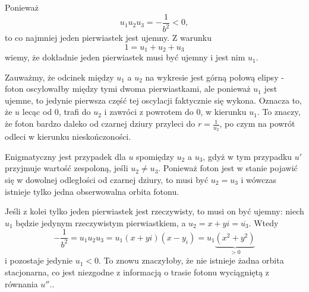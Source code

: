 Ponieważ 
$$u_1u_2u_3=-\frac{1}{b^2}<0,$$ 
to co najmniej jeden pierwiastek jest ujemny. Z warunku 
$$1=u_1+u_2+u_3$$ 
wiemy, że dokładnie jeden pierwiastek musi być ujemny i jest nim $u_1$. 

Zauważmy, że odcinek między $u_1$ a $u_2$ na wykresie jest górną połową elipsy - foton oscylowałby między tymi dwoma pierwiastkami, ale ponieważ $u_1$ jest ujemne, to jedynie pierwsza część tej oscylacji faktycznie się wykona. Oznacza to, że $u$ lecąc od $0$, trafi do $u_2$ i zawróci z powrotem do $0$, w kierunku $u_1$. To znaczy, że foton bardzo daleko od czarnej dziury przyleci do $r=\frac{1}{u_2}$, po czym na powrót odleci w kierunku nieskończoności.

Enigmatyczny jest przypadek dla $u$ spomiędzy $u_2$ a $u_3$, gdyż w tym przypadku $u'$ przyjmuje wartość zespoloną, jeśli $u_2\neq u_3$. Ponieważ foton jest w stanie pojawić się w dowolnej odległości od czarnej dziury, to musi być $u_2=u_3$ i wówczas istnieje tylko jedna obserwowalna orbita fotonu.

Jeśli z kolei tylko jeden pierwiastek jest rzeczywisty, to musi on być ujemny: niech $u_1$ będzie jedynym rzeczywistym pierwiastkiem, a $u_2=x+yi=\overline{u_3}$. Wtedy
$$-\frac{1}{b^2}=u_1u_2u_3=u_1(x+yi)(x-y_i)=u_1\underbrace{(x^2+y^2)}_{>0}$$
i pozostaje jedynie $u_1<0$. To znowu znaczyłoby, że nie istnieje żadna orbita stacjonarna, co jest niezgodne z informacją o trasie fotonu wyciągniętą z równania $u''$..
